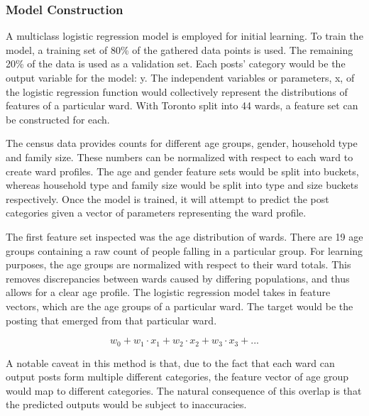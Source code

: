 \documentclass[12pt]{article}
\begin{document}
\subsubsection{Model Construction}
A multiclass logistic regression model is employed for initial learning. To train the model, a training set of 80\% of the gathered data points is used. The remaining 20\% of the data is used as a validation set. Each posts' category would be the output variable for the model: y. The independent variables or parameters, x, of the logistic regression function would collectively represent the distributions of features of a particular ward. With Toronto split into 44 wards, a feature set can be constructed for each.

The census data provides counts for different age groups, gender, household type and family size. These numbers can be normalized with respect to each ward to create ward profiles. The age and gender feature sets would be split into buckets, whereas household type and family size would be split into type and size buckets respectively. Once the model is trained, it will attempt to predict the post categories given a vector of parameters representing the ward profile. 

The first feature set inspected was the age distribution of wards. There are 19 age groups containing a raw count of people falling in a particular group. For learning purposes, the age groups are normalized with respect to their ward totals. This removes discrepancies between wards caused by differing populations, and thus allows for a clear age profile. The logistic regression model takes in feature vectors, which are the age groups of a particular ward. The target would be the posting that emerged from that particular ward.

\[w_0 + w_1 \cdot x_1 + w_2 \cdot x_2 + w_3 \cdot x_3 + ...\]

A notable caveat in this method is that, due to the fact that each ward can output posts form multiple different categories, the feature vector of age group would map to different categories. The natural consequence of this overlap is that the predicted outputs would be subject to inaccuracies. 
\end{document}
